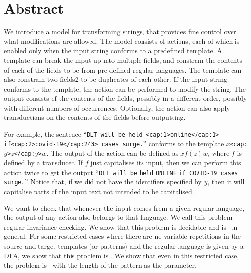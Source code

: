 
\section{Abstract}\label{sec:c03-abstract}

We introduce a model for transforming strings, that provides fine control over what modifications are allowed. The model consists of actions, each of which is enabled only when the input string conforms to a predefined template. A template can break the input up into multiple fields, and constrain the contents of each of the fields to be from pre-defined regular languages. The template can also constrain two fields2 to be duplicates of each other. If the input string conforms to the template, the action can be performed to modify the string. The output consists of the contents of the fields, possibly in a different order, possibly with different numbers of occurrences. Optionally, the action can also apply transductions on the contents of the fields before outputting.

For example, the sentence ``\verb|DLT will be held <cap:1>online</cap:1>| \verb|if|\verb|<cap:2>covid-19</cap:243> cases surge.|'' conforms to the template \texttt{$x$<cap:$y$>$z$</cap:$y$>$w$}. The output of the action can be defined as $xf(z)w$, where $f$ is defined by a transducer. If $f$ just capitalises its input, then we can perform this action twice to get the output ``\verb|DLT will be| \verb|held|  \verb|ONLINE| \verb|if COVID-19 cases surge.|'' Notice that, if we did not have the identifiers specified by $y$, then it will capitalise parts of the input text not intended to be capitalised.

We want to check that whenever the input comes from a given regular language, the output of any action also belongs to that language. We call this problem regular invariance checking. We show that this problem is decidable and is \pspc\ in general. For some restricted cases where there are no variable repetitions in the source and target templates (or patterns) and the regular language is given by a DFA, we show that this problem is \conpc. We show that even in this restricted case, the problem is \woneh\ with the length of the pattern as the parameter.
